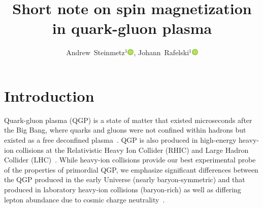 \documentclass[epjST]{svjour}
\newcommand{\orcidicon}{\includegraphics[width=0.32cm]{orcid.pdf}}
\newcommand{\orc}[1]{\href{https://orcid.org/#1}{\orcidicon}}
\newcommand{\orcJR}{0000-0001-8217-1484}
\newcommand{\orcAJS}{0000-0001-5474-2649}
\numberwithin{equation}{section}
\begin{document}
\title{Short note on spin magnetization in quark-gluon plasma
    }

\author{
    Andrew~Steinmetz${}^1$\orc{\orcAJS},
    Johann~Rafelski${}^1$\orc{\orcJR}
    }



\maketitle

\section{Introduction}
\label{sec:introduction}
Quark-gluon plasma (QGP) is a state of matter that existed microseconds after the Big Bang, where quarks and gluons were not confined within hadrons but existed as a free deconfined plasma~\cite{Letessier:2002ony,Rafelski:2015cxa,Rafelski:2023emw,Rafelski:2024fej,Shuryak:2004cy,HotQCD:2014kol}. QGP is also produced in high-energy heavy-ion collisions at the Relativistic Heavy Ion Collider (RHIC) and Large Hadron Collider (LHC)~\cite{Rafelski:1982pu,STAR:2005gfr,Palni:2024wdy,Mu:2025gtr}. While heavy-ion collisions provide our best experimental probe of the properties of primordial QGP, we emphasize significant differences between the QGP produced in the early Universe (nearly baryon-symmetric) and that produced in laboratory heavy-ion collisions (baryon-rich) as well as differing lepton abundance due to cosmic charge neutrality~\cite{Yang:2024ret}.
\end{document}
